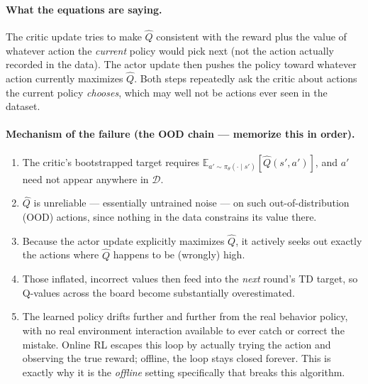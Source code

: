 \documentclass[11pt]{article}
\begin{document}
\paragraph{What the equations are saying.}
The critic update tries to make $\hat Q$ consistent with the reward plus the value of
whatever action the \emph{current} policy would pick next (not the action actually
recorded in the data). The actor update then pushes the policy toward whatever action
currently maximizes $\hat Q$. Both steps repeatedly ask the critic about actions the
current policy \emph{chooses}, which may well not be actions ever seen in the dataset.

\paragraph{Mechanism of the failure (the OOD chain --- memorize this in order).}
\begin{enumerate}
\item The critic's bootstrapped target requires $\mathbb{E}_{a'\sim\pi_\theta(\cdot\mid
s')}[\hat Q(s',a')]$, and $a'$ need not appear anywhere in $\mathcal{D}$.
\item $\hat Q$ is unreliable --- essentially untrained noise --- on such out-of-distribution
(OOD) actions, since nothing in the data constrains its value there.
\item Because the actor update explicitly maximizes $\hat Q$, it actively seeks out
exactly the actions where $\hat Q$ happens to be (wrongly) high.
\item Those inflated, incorrect values then feed into the \emph{next} round's TD target,
so Q-values across the board become substantially overestimated.
\item The learned policy drifts further and further from the real behavior policy, with
no real environment interaction available to ever catch or correct the mistake. Online
RL escapes this loop by actually trying the action and observing the true reward;
offline, the loop stays closed forever. This is exactly why it is the \emph{offline}
setting specifically that breaks this algorithm.
\end{enumerate}
\end{document}
